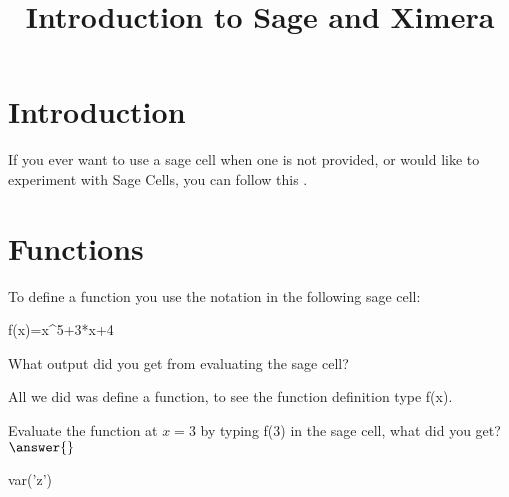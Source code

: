 \documentclass{ximera}
\title{Introduction to Sage and Ximera}
\begin{document}
\maketitle
\section{Introduction}
If you ever want to use a sage cell when one is not provided, or would like to experiment with Sage Cells, you can follow this .
\section{Functions}
To define a function you use the notation in the following sage cell:
\begin{onlineOnly}
\begin{sageCell}
f(x)=x^5+3*x+4
\end{sageCell}
\end{onlineOnly}
\begin{question}
What output did you get from evaluating the sage cell?
\begin{multipleChoice}
\end{multipleChoice}
\begin{feedback}
All we did was define a function, to see the function definition type f(x).
\end{feedback}
Evaluate the function at $x=3$ by typing f(3) in the sage cell, what did you get? $\answer{}$
\end{question}

\begin{onlineOnly}
\begin{sageCell}
var('z')
\end{sageCell}
\end{onlineOnly}
\end{document}
